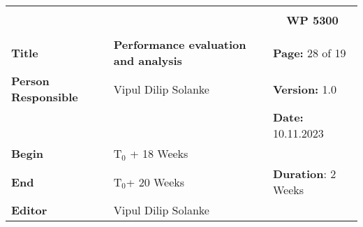 \begin{table}[!h]
  \begin{center}
    \begin{tabular}{|p{35mm}||p{55mm}|p{50mm}||p{40mm}|}
      \hline
      \multicolumn{3}{|l||}{\textbf{}} & \multicolumn{1}{c|}{}                                                                                                                                                \\
      \multicolumn{3}{|l||}{\textbf{}} & \multicolumn{1}{c|}{\textbf{WP 5300}}                                                                                                                                \\
      \multicolumn{3}{|l||}{\textbf{}} & \multicolumn{1}{c|}{}                                                                                                                                                \\
      \hline\hline
      \textbf{Title}                   & \multicolumn{2}{p{7cm}||}{\textbf{Performance evaluation and analysis}}
                                       & \textbf{Page:} 28 of 19                                                                                                                                            \\
      \hline
      \textbf{Person Responsible}        & \multicolumn{2}{l||}{Vipul Dilip Solanke}                                                                                                   & \textbf{Version:} 1.0   \\
      \hline
      \multicolumn{3}{|l||}{}          & \textbf{Date:} 10.11.2023                                                                                                                                          \\
      \hline\hline
      \textbf{Begin}                  & \multicolumn{2}{l||}{T$_0$ + 18 Weeks}                                                                                                                &                         \\
      \hline
      \textbf{End}                    & \multicolumn{2}{l||}{T$_0$+ 20 Weeks}                                                                                                        & \textbf{Duration}: 2 Weeks \\
      \hline\hline
      \textbf{Editor}              & \multicolumn{3}{l|}{Vipul Dilip Solanke}                                                                                                                              \\

\end{tabular}
\end{center}
\end{table}
